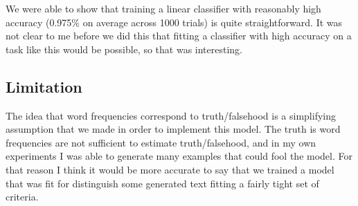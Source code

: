 \documentclass[
10pt, %
a4paper, %
oneside, %
headinclude,footinclude, %
BCOR5mm, %
]{scrartcl}
\begin{document}
We were able to show that training a linear classifier with reasonably high accuracy (0.975\% on average across 1000 trials) is quite straightforward. It was not clear to me before we did this that fitting a classifier with high accuracy on a task like this would be possible, so that was interesting.

\subsection{Limitation}

The idea that word frequencies correspond to truth/falsehood is a simplifying assumption that we made in order to implement this model. The truth is word frequencies are not sufficient to estimate truth/falsehood, and in my own experiments I was able to generate many examples that could fool the model. For that reason I think it would be more accurate to say that we trained a model that was fit for distinguish some generated text fitting a fairly tight set of criteria.


\renewcommand{\refname}{\spacedlowsmallcaps{References}} %




\end{document}
